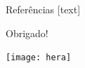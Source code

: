 \documentclass{beamer}
\begin{document}
  \begin{frame}{Referências}
    [text]
    
    
  \end{frame}


  \begin{frame}
    \begin{center}
      Obrigado!
      \begin{center}
        \texttt{[image: hera]}
      \end{center}
    \end{center}
  \end{frame}
\end{document}
